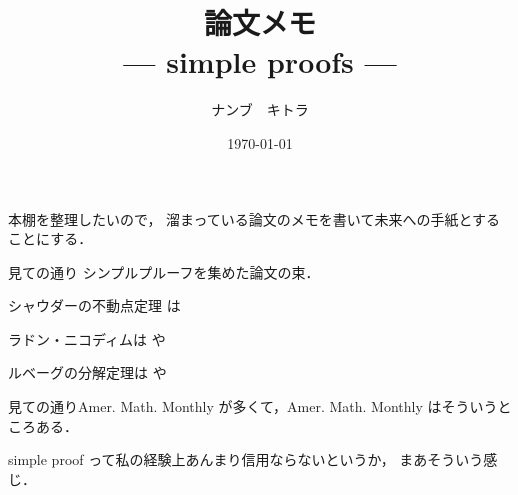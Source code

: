 \documentclass[leqno, a4paper, 12pt]{jsarticle}
\title{論文メモ
\large{\\--- simple proofs ---}
}
\author{ナンブ　キトラ}
\date{\today}
\begin{document}
\maketitle

本棚を整理したいので，
溜まっている論文のメモを書いて未来への手紙とすることにする．



見ての通り
シンプルプルーフを集めた論文の束．

シャウダーの不動点定理
は
\cite{runde2010new}

ラドン・ニコディムは
\cite{MR1903516}
や
\cite{MR1984406}

ルベーグの分解定理は
\cite{MR3261907}
や
\cite{MR3399113}

見ての通りAmer. Math. Monthly 
が多くて，Amer. Math. Monthly
はそういうところある．


simple proof って私の経験上あんまり信用ならないというか，
まあそういう感じ．


\nocite{*}


\end{document}
